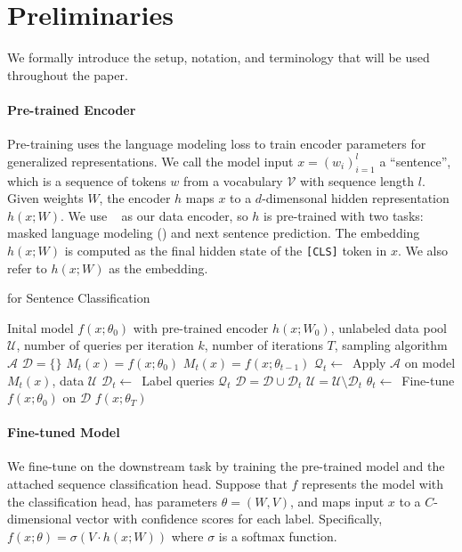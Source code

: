 \section{Preliminaries}
\label{sec:prelim}
We formally introduce the setup, notation, and terminology that
will be used throughout the paper.

\paragraph{Pre-trained Encoder}
Pre-training uses the language modeling loss
to train encoder parameters for generalized representations.
We call the model input $x=(w_i)_{i=1}^l$ a
``sentence'', which is a sequence of tokens $w$ from a vocabulary $\mathcal{V}$ with
 sequence length $l$.
Given weights $W$, the encoder $h$ maps $x$ to a
$d$-dimensonal hidden
representation $h(x; W)$.
We use \bert~\citep{devlin-2019} as our data
encoder, so $h$ is pre-trained with two tasks: masked language modeling (\mlm{}) and next sentence
prediction.
The embedding $h(x;W)$ is computed as the final
hidden state of the \texttt{[CLS]} token in $x$. We
also refer to $h(x;W)$ as the \bert{} embedding.

\begin{algorithm}[!t]
    \caption{ for Sentence Classification}
\label{alg:active}
\begin{algorithmic}[1]
    \Require Inital model $f(x; \theta_0)$
    with pre-trained encoder $h(x; W_0)$, unlabeled data pool
    $\mathcal{U}$, number of queries per iteration $k$, number of
    iterations $T$, sampling
    algorithm $\mathcal{A}$
    \State $\mathcal{D} = \{\}$
        \State $M_t(x) = f(x; \theta_0)$
        \Else
        \State $M_t(x) = f(x; \theta_{t-1})$
        \EndIf
        \State $\mathcal{Q}_t \gets$~Apply $\mathcal{A}$ on model $M_t(x)$, data
        $\mathcal{U}$
        \State $\mathcal{D}_t \gets$~Label queries $\mathcal{Q}_t$
        \State $\mathcal{D} = \mathcal{D} \cup \mathcal{D}_t$
        \State $\mathcal{U} = \mathcal{U} \setminus \mathcal{D}_t$
        \State $\theta_t \gets$~Fine-tune $f(x; \theta_0)$
        on $\mathcal{D}$
    \EndFor
    \State \Return $f(x; \theta_T)$
\end{algorithmic}
\end{algorithm}

\paragraph{Fine-tuned Model}
We fine-tune \bert{} on the downstream task by training the pre-trained model and the attached sequence
classification head.
Suppose that $f$ represents the model with the classification head, has
parameters $\theta = (W,V)$, and
maps input $x$
to a $C$-dimensional vector with confidence scores for each label.
Specifically, $f(x; \theta)
= \sigma(V \cdot h(x; W))$ where $\sigma$ is a softmax function.

